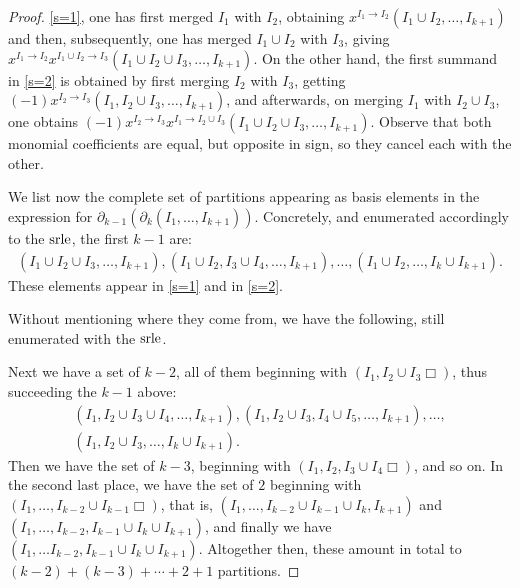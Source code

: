 \documentclass[ALCO]{cedram}
\newcommand{\dif}{\mbox{$\partial$}}
\newcommand{\srle}{\mbox{${\rm srle}$}}
\begin{document}
\begin{proof}
\eqref{s=1}, one has first merged $I_1$ with $I_2$, obtaining
$x^{I_1\to I_2}(I_1\cup I_2,\ldots ,I_{k+1})$ and then, subsequently,
one has merged $I_1\cup I_2$ with $I_3$, giving $x^{I_1\to
  I_2}x^{I_1\cup I_2\to I_3}(I_1\cup I_2\cup I_3,\ldots ,I_{k+1})$. On
the other hand, the first summand in \eqref{s=2} is obtained by first
merging $I_2$ with $I_3$, getting $(-1)x^{I_2\to I_3}(I_1,I_2\cup
I_3,\ldots ,I_{k+1})$, and afterwards, on merging $I_1$ with $I_2\cup
I_3$, one obtains $(-1)x^{I_2\to I_3}x^{I_1\to I_2\cup I_3}(I_1\cup
I_2\cup I_3,\ldots ,I_{k+1})$. Observe that both monomial coefficients
are equal, but opposite in sign, so they cancel each with the other.

We list now the complete set of partitions appearing as basis elements
in the expression for
$\dif_{k-1}(\dif_{k}(I_1,\ldots,I_{k+1}))$. Concretely, and enumerated
accordingly to the $\srle$, the first $k-1$ are:
\begin{eqnarray*}
(I_1\cup I_2\cup I_3,\ldots ,I_{k+1}),(I_1\cup I_2,I_3\cup I_4,\ldots
  ,I_{k+1}),\ldots ,(I_1\cup I_2,\ldots , I_k\cup I_{k+1}).
\end{eqnarray*}
These elements appear in \eqref{s=1} and in \eqref{s=2}. 

Without mentioning where they come from, we have the following, still
enumerated with the $\srle$.

Next we have a set of $k-2$, all of them beginning with $(I_1,I_2\cup
I_3\Box)$, thus succeeding the $k-1$ above:
\begin{multline*}
(I_1,I_2\cup I_3\cup I_4,\ldots ,I_{k+1}), (I_1,I_2\cup I_3, I_4\cup
  I_5,\ldots ,I_{k+1}),\ldots ,\\ (I_1,I_2\cup I_3,\ldots ,I_k\cup I_{k+1}).
\end{multline*}
Then we have the set of $k-3$, beginning with $(I_1,I_2,I_3\cup
I_4\Box)$, and so on. In the second last place, we have the set of $2$
beginning with $(I_1,\ldots ,I_{k-2}\cup I_{k-1}\Box)$, that is,
$(I_1,\ldots ,I_{k-2}\cup I_{k-1}\cup I_{k},I_{k+1})$ and $(I_1,\ldots
,I_{k-2},I_{k-1}\cup I_{k}\cup I_{k+1})$, and finally we have $(I_1,\ldots
I_{k-2}, I_{k-1}\cup I_{k}\cup I_{k+1})$. Altogether then, these
amount in total to $(k-2)+(k-3)+\cdots +2+1$ partitions.


\end{proof}
\end{document}
